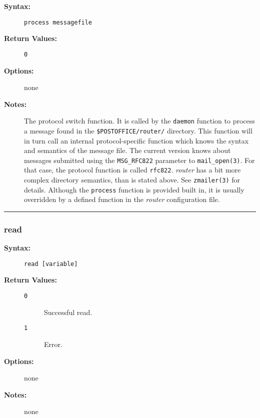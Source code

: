 \begin{description}
\item[{\bf Syntax:}] \mbox{}

{\tt process messagefile}

\item[{\bf Return Values:}] \mbox{}

\begin{description}
\item[{\tt 0}] \mbox{}



\end{description}


\item[{\bf Options:}] \mbox{}

none  

\item[{\bf Notes:}] \mbox{}

The protocol switch function. It is called by
the {\tt daemon} function to process a message found in the 
{\tt \$POSTOFFICE/router/} directory. This function will 
in turn call an internal protocol-specific function which knows the 
syntax and semantics of the message file. The current version knows 
about messages submitted using the {\tt MSG\_RFC822} parameter to 
{\tt mail\_open(3)}. For that case, the protocol function is called 
{\tt rfc822}. {\em router} has a bit more complex directory 
semantics, than is stated above. See {\tt zmailer(3)} for details. 
Although the {\tt process} function is provided built in, it is 
usually overridden by a defined function in the {\em router} 
configuration file.

\end{description}


\hrule
\subsubsection{read}

\begin{description}
\item[{\bf Syntax:}] \mbox{}

{\tt read [variable]}

\item[{\bf Return Values:}] \mbox{}

\begin{description}
\item[{\tt 0}] \mbox{}

Successful read.

\item[{\tt 1}] \mbox{}

Error.

\end{description}


\item[{\bf Options:}] \mbox{}

none  

\item[{\bf Notes:}] \mbox{}

none  

\end{description}


